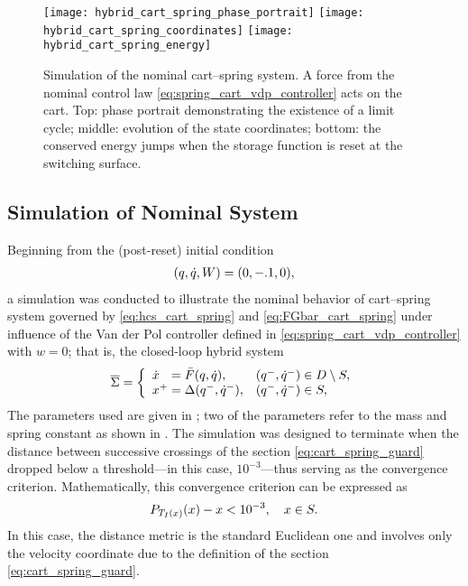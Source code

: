 \begin{figure*}[htp!]
  \centering
  \texttt{[image: hybrid\_cart\_spring\_phase\_portrait]}
  \texttt{[image: hybrid\_cart\_spring\_coordinates]}
  \texttt{[image: hybrid\_cart\_spring\_energy]}
  \caption[Simulation of the nominal cart--spring system.]{Simulation of the
    nominal cart--spring system.
    A force from the nominal control law \eqref{eq:spring_cart_vdp_controller}
    acts on the cart.
    Top: phase portrait demonstrating the existence of a limit cycle;
    middle: evolution of the state coordinates;
    bottom: the conserved energy jumps when the storage function is reset at the
    switching surface.}
  \label{fig:cart_spring_simulation_nominal}
\end{figure*}


\subsection{Simulation of Nominal System}
Beginning from the (post-reset) initial condition
\begin{align*}
  (q, \dot{q}, W) = (0, -.1, 0),
\end{align*}
a simulation was conducted to illustrate the nominal behavior of cart--spring
system governed by \eqref{eq:hcs_cart_spring} and \eqref{eq:FGbar_cart_spring}
under influence of the Van der Pol controller defined in
\eqref{eq:spring_cart_vdp_controller} with $w = 0$;
%
that is, the closed-loop hybrid system
\begin{align}
  \label{eq:hs_cart_spring_nominal}
  {\overline {\Sigma}} = \left\{
    \begin{array}{l l}
      {\dot {x}}\hphantom{^+} = {\bar {F}}(q, \dot{q}), & (q^{-}, \dot{q}^{-}) \in D \setminus S,\\
      x^{+} = \Delta(q^{-}, \dot{q}^{-}), & (q^{-}, \dot{q}^{-}) \in S,
    \end{array}\right.
\end{align}
%
The parameters used are given in ; two of the
parameters refer to the mass and spring constant as shown in .
%
The simulation was designed to terminate when the distance between successive
crossings of the \Poincare{} section \eqref{eq:cart_spring_guard} dropped below
a threshold---in this case, $10^{-3}$---thus serving as the convergence
criterion.
%
Mathematically, this convergence criterion can be expressed as
\begin{align}
  \label{eq:cart_spring_convergence}
  P_{T_{I}(x)}(x) - x < 10^{-3}, \quad x \in S.
\end{align}
%
In this case, the distance metric is the standard Euclidean one and involves
only the velocity coordinate due to the definition of the \Poincare{} section
\eqref{eq:cart_spring_guard}.

